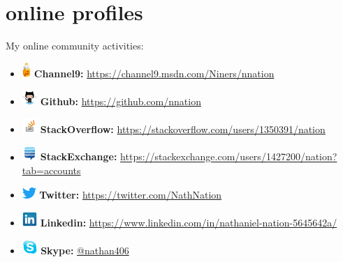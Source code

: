 \documentclass[]{friggeri-cvRS}
\begin{document}

\section{online profiles}

My online community activities:
\begin{itemize}[noitemsep]
	\item[] \includegraphics[height=16pt]{images/ch9Icon.png} \textbf{Channel9: }\href{https://channel9.msdn.com/Niners/nnation}{https://channel9.msdn.com/Niners/nnation}
	\item[] \includegraphics[height=16pt]{images/octocat.png} \textbf{Github: }\href{https://github.com/nnation}{https://github.com/nnation}
	\item[] \includegraphics[height=16pt]{images/stackoverflow.png} \textbf{StackOverflow: }\href{https://stackoverflow.com/users/1350391/nation}{https://stackoverflow.com/users/1350391/nation}
	\item[] \includegraphics[height=16pt]{images/stackexchange.png} \textbf{StackExchange: } \href {https://stackexchange.com/users/1427200/nation?tab=accounts}{https://stackexchange.com/users/1427200/nation?tab=accounts}
	\item[] \includegraphics[height=12pt]{images/twitter.png}  \textbf{Twitter: }\href {https://twitter.com/NathNation}{https://twitter.com/NathNation}
    	\item[] \includegraphics[height=16pt]{images/linkedin.png}  \textbf{Linkedin: }\href {https://www.linkedin.com/in/nathaniel-nation-5645642a/}{https://www.linkedin.com/in/nathaniel-nation-5645642a/}
	\item[] \includegraphics[height=16pt]{images/skype.png} \textbf{Skype: }\href {https://web.skype.com/en}{@nathan406}
\end{itemize}
\end{document}
